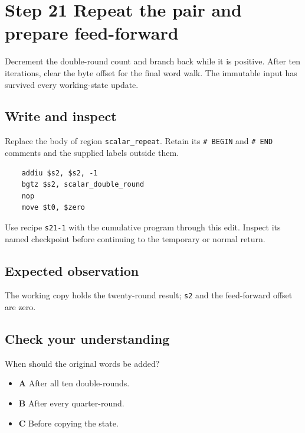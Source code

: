 \section{Step 21 Repeat the pair and prepare feed-forward}\label{chacha-s21}

Decrement the double-round count and branch back while it is positive. After ten iterations, clear the byte offset for the final word walk. The immutable input has survived every working-state update.

\subsection{Write and inspect}
Replace the body of region \texttt{scalar\_repeat}. Retain its \texttt{\# BEGIN} and \texttt{\# END} comments and the supplied labels outside them.

\begin{verbatim}
    addiu $s2, $s2, -1
    bgtz $s2, scalar_double_round
    nop
    move $t0, $zero
\end{verbatim}

Use recipe \texttt{s21-1} with the cumulative program through this edit. Inspect its named checkpoint before continuing to the temporary or normal return.

\subsection{Expected observation}
The working copy holds the twenty-round result; \texttt{s2} and the feed-forward offset are zero.

\subsection{Check your understanding}
When should the original words be added?

\begin{itemize}
\item \textbf{A} After all ten double-rounds.
\item \textbf{B} After every quarter-round.
\item \textbf{C} Before copying the state.
\end{itemize}
